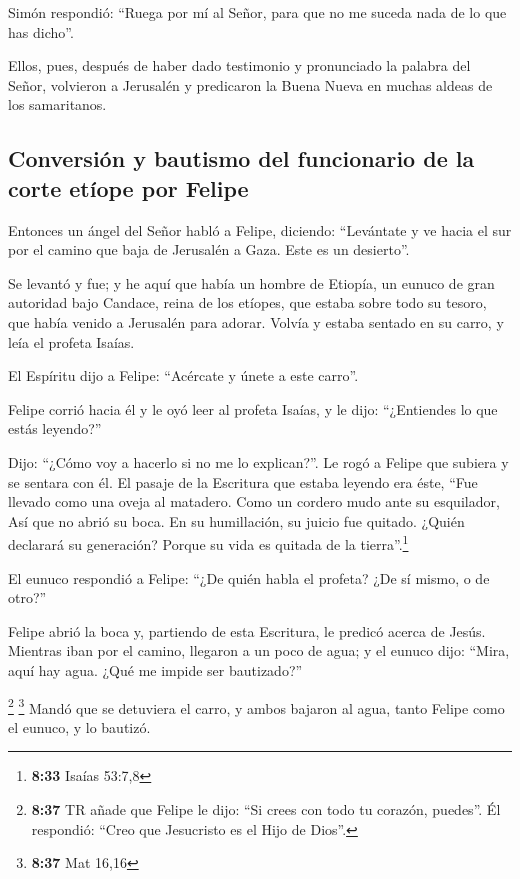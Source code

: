  Simón respondió: ``Ruega por mí al Señor, para que no me
suceda nada de lo que has dicho''.

 Ellos, pues, después de haber dado testimonio y
pronunciado la palabra del Señor, volvieron a Jerusalén y predicaron la
Buena Nueva en muchas aldeas de los samaritanos.

\hypertarget{conversiuxf3n-y-bautismo-del-funcionario-de-la-corte-etuxedope-por-felipe}{%
\subsection{Conversión y bautismo del funcionario de la corte etíope por
Felipe}\label{conversiuxf3n-y-bautismo-del-funcionario-de-la-corte-etuxedope-por-felipe}}

 Entonces un ángel del Señor habló a Felipe, diciendo:
``Levántate y ve hacia el sur por el camino que baja de Jerusalén a
Gaza. Este es un desierto''.

 Se levantó y fue; y he aquí que había un hombre de
Etiopía, un eunuco de gran autoridad bajo Candace, reina de los etíopes,
que estaba sobre todo su tesoro, que había venido a Jerusalén para
adorar.  Volvía y estaba sentado en su carro, y leía el
profeta Isaías.

 El Espíritu dijo a Felipe: ``Acércate y únete a este
carro''.

 Felipe corrió hacia él y le oyó leer al profeta Isaías,
y le dijo: ``¿Entiendes lo que estás leyendo?''

 Dijo: ``¿Cómo voy a hacerlo si no me lo explican?''. Le
rogó a Felipe que subiera y se sentara con él.  El pasaje
de la Escritura que estaba leyendo era éste, ``Fue llevado como una
oveja al matadero. Como un cordero mudo ante su esquilador, Así que no
abrió su boca.  En su humillación, su juicio fue quitado.
¿Quién declarará su generación? Porque su vida es quitada de la
tierra''.\footnote{\textbf{8:33} Isaías 53:7,8}

 El eunuco respondió a Felipe: ``¿De quién habla el
profeta? ¿De sí mismo, o de otro?''

 Felipe abrió la boca y, partiendo de esta Escritura, le
predicó acerca de Jesús.  Mientras iban por el camino,
llegaron a un poco de agua; y el eunuco dijo: ``Mira, aquí hay agua.
¿Qué me impide ser bautizado?''

 \footnote{\textbf{8:37} TR añade que Felipe le dijo:
  ``Si crees con todo tu corazón, puedes''. Él respondió: ``Creo que
  Jesucristo es el Hijo de Dios''.} \footnote{\textbf{8:37} Mat 16,16}
 Mandó que se detuviera el carro, y ambos bajaron al
agua, tanto Felipe como el eunuco, y lo bautizó.

